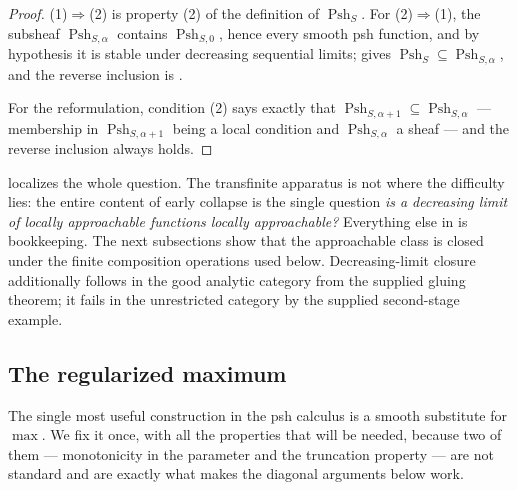 \begin{proof}
(1)$\Rightarrow$(2) is property (2) of the definition of
$\operatorname{Psh}_S$.  For (2)$\Rightarrow$(1), the subsheaf
$\operatorname{Psh}_{S,\alpha}$ contains $\operatorname{Psh}_{S,0}$, hence
every smooth psh function, and by hypothesis it is stable under decreasing
sequential limits;  gives
$\operatorname{Psh}_S\subseteq\operatorname{Psh}_{S,\alpha}$, and the reverse
inclusion is .

For the reformulation, condition (2) says exactly that
$\operatorname{Psh}_{S,\alpha+1}\subseteq\operatorname{Psh}_{S,\alpha}$ ---
membership in $\operatorname{Psh}_{S,\alpha+1}$ being a local condition and
$\operatorname{Psh}_{S,\alpha}$ a sheaf --- and the reverse inclusion always
holds.
\end{proof}

 localizes the whole question.  The
transfinite apparatus is not where the difficulty lies: the entire content of
early collapse is the single question \emph{is a decreasing limit of locally
approachable functions locally approachable?}  Everything else in
 is bookkeeping.  The next subsections show that the
approachable class is closed under the finite composition operations used
below.  Decreasing-limit closure additionally follows in the good analytic
category from the supplied gluing theorem; it fails in the unrestricted
category by the supplied second-stage example.

\subsection{The regularized maximum}
\label{sec:ch15-regmax}

The single most useful construction in the psh calculus is a smooth
substitute for $\max$.  We fix it once, with all the properties that will be
needed, because two of them --- monotonicity in the parameter and the
truncation property --- are not standard and are exactly what makes the
diagonal arguments below work.

